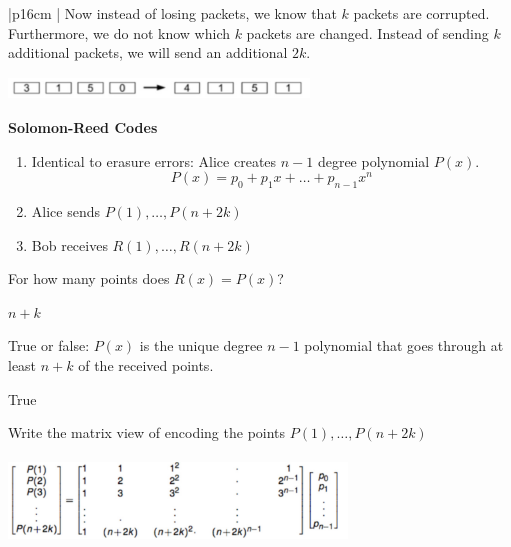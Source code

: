 {\tabulinesep=1mm
\begin{tabu}{|p{16cm} |}
\hline
Now instead of losing packets, we know that $k$ packets are corrupted. 
Furthermore, we do not know which $k$ packets are changed. Instead of 
sending $k$ additional packets, we will send an additional $2k$.\newline
\begin{center}
\includegraphics[width=8cm, height=0.6cm]{general_intro.jpg}
\end{center}

\textbf{Solomon-Reed Codes}
\begin{enumerate}
\item Identical to erasure errors: Alice creates $n - 1$ degree polynomial 
$P(x)$.\newline
\[P(x) = p_0 + p_1x + \dotsc + p_{n-1}x^n \]
\item Alice sends $P(1), \dotsc, P(n + 2k)$ \\
\item Bob receives $R(1), \dotsc, R(n + 2k) $ \newline
\end{enumerate}

For how many points does $R(x) = P(x)$? \newline
\begin{solution}
$ n + k$
\end{solution}

True or false: $P(x)$ is the unique degree $n - 1$ polynomial that goes 
through at least $n + k$ of the received points.\newline
\begin{solution}
True
\end{solution}

Write the matrix view of encoding the points $P(1), \dotsc, P(n + 2k)$
\begin{solution}[1cm]
\begin{center}
\includegraphics[width=9cm, height=2.3cm]{general_intro_matrix.jpg}
\end{center}
\end{solution}

\\
\hline
\end{tabu}
}

